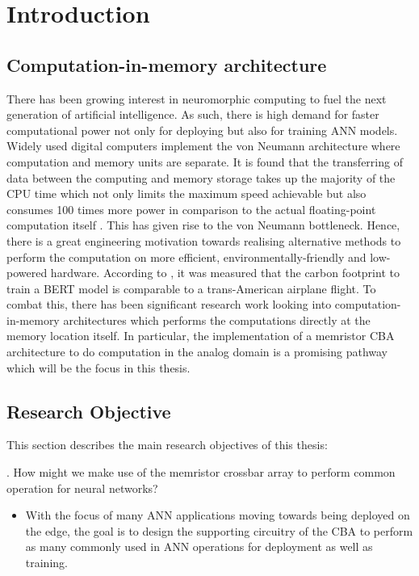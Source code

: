 
\chapter{Introduction}
\label{ch:introduction}

\vspace{2em}

\section{Computation-in-memory architecture}

There has been growing interest in neuromorphic computing to fuel the next generation of artificial intelligence. As such, there is high demand for faster computational power not only for deploying but also for training \ac{ANN} models. Widely used digital computers implement the von Neumann architecture where computation and memory units are separate. It is found that the transferring of data between the computing and memory storage takes up the majority of the \acs{CPU} time which not only limits the maximum speed achievable but also consumes 100 times more power in comparison to the actual floating-point computation itself \cite{Zou_Xu_Chen_Yan_Han_2021}. This has given rise to the von Neumann bottleneck. Hence, there is a great engineering motivation towards realising alternative methods to perform the computation on more efficient, environmentally-friendly and low-powered hardware. According to \citet{Strubell_Ganesh_McCallum_2019} \cite{Strubell_Ganesh_McCallum_2019}, it was measured that the carbon footprint to train a \acs{BERT} model is comparable to a trans-American airplane flight. To combat this, there has been significant research work looking into computation-in-memory architectures which performs the computations directly at the memory location itself. In particular, the implementation of a memristor \ac{CBA} architecture to do computation in the analog domain is a promising pathway which will be the focus in this thesis.

\newpage

\section{Research Objective}
\noindent This section describes the main research objectives of this thesis:

. How might we make use of the memristor crossbar array to perform common operation for neural networks?
  \begin{itemize}
    \item With the focus of many \ac{ANN} applications moving towards being deployed on the edge, the goal is to design the supporting circuitry of the \ac{CBA} to perform as many commonly used in \ac{ANN} operations for deployment as well as training.
  \end{itemize}

